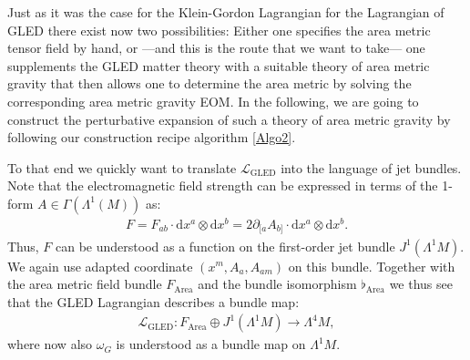 Just as it was the case for the Klein-Gordon Lagrangian for the Lagrangian of GLED there exist now two possibilities: Either one specifies the area metric tensor field by hand, or ---and this is the route that we want to take--- one supplements the GLED matter theory with a suitable theory of area metric gravity that then allows one to determine the area metric by solving the corresponding area metric gravity EOM. 
In the following, we are going to construct the perturbative expansion of such a theory of area metric gravity by following our construction recipe algorithm \ref{Algo2}.

To that end we quickly want to translate $\mathcal{L}_{\text{GLED}}$ into the language of jet bundles. Note that the electromagnetic field strength can be expressed in terms of the 1-form $A \in \Gamma(\Lambda^1(M))$ as:
\begin{align}
F = F_{ab} \cdot  \mathrm{d}x^a \otimes \mathrm{d}x^b = 2 \partial_{[a} A_{b]} \cdot \mathrm{d}x^a \otimes \mathrm{d}x^b.
\end{align}
Thus, $F$ can be understood as a function on the first-order jet bundle $J^1(\Lambda^1M)$. We again use adapted coordinate $(x^m,A_a,A_{am})$ on this bundle. Together with the area metric field bundle $F_{\text{Area}}$ and the bundle isomorphism $\flat_{\text{Area}}$ we thus see that the GLED Lagrangian describes a bundle map:
\begin{align}
\mathcal{L}_{\text{GLED}} : F_{\text{Area}} \oplus J^1(\Lambda^1M) \rightarrow \Lambda^4M,
\end{align}
where now also $\omega_G$ is understood as a bundle map on $\Lambda^1M$.  

